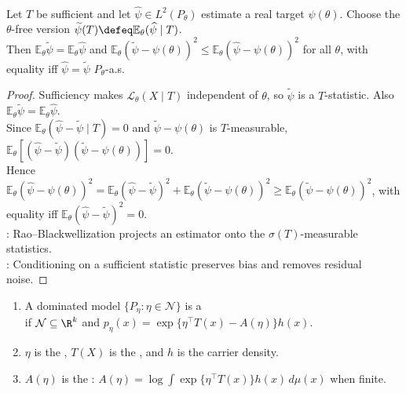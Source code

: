\begin{theorem} \label{thm:rao-blackwell-improvement} \\
Let $T$ be sufficient and let $\widehat{\psi}\in L^2(P_\theta)$ estimate a real target $\psi(\theta)$. Choose the $\theta$-free version $\widetilde{\psi}(T)\defeq\mathbb{E}_\theta(\widehat{\psi}\mid T)$.\\
Then $\mathbb{E}_\theta\widetilde{\psi}=\mathbb{E}_\theta\widehat{\psi}$ and $\mathbb{E}_\theta(\widetilde{\psi}-\psi(\theta))^2\leq\mathbb{E}_\theta(\widehat{\psi}-\psi(\theta))^2$ for all $\theta$, with equality iff $\widehat{\psi}=\widetilde{\psi}$ $P_\theta$-a.s.
\begin{proof}
Sufficiency makes $\mathcal{L}_\theta(X\mid T)$ independent of $\theta$, so $\widetilde{\psi}$ is a $T$-statistic. Also $\mathbb{E}_\theta\widetilde{\psi}=\mathbb{E}_\theta\widehat{\psi}$.\\
Since $\mathbb{E}_\theta(\widehat{\psi}-\widetilde{\psi}\mid T)=0$ and $\widetilde{\psi}-\psi(\theta)$ is $T$-measurable, $\mathbb{E}_\theta[(\widehat{\psi}-\widetilde{\psi})(\widetilde{\psi}-\psi(\theta))]=0$.\\
Hence $\mathbb{E}_\theta(\widehat{\psi}-\psi(\theta))^2=\mathbb{E}_\theta(\widehat{\psi}-\widetilde{\psi})^2+\mathbb{E}_\theta(\widetilde{\psi}-\psi(\theta))^2\geq\mathbb{E}_\theta(\widetilde{\psi}-\psi(\theta))^2$, with equality iff $\mathbb{E}_\theta(\widehat{\psi}-\widetilde{\psi})^2=0$.\\
: Rao--Blackwellization projects an estimator onto the $\sigma(T)$-measurable statistics.\\
: Conditioning on a sufficient statistic preserves bias and removes residual noise.
\end{proof}
\end{theorem}

\begin{definition} \label{def:exponential-family-natural-statistic} 
\begin{enumerate}[label=(\roman*)]
\setlength{\itemsep}{0pt}
\item A dominated model $\{P_\eta:\eta\in\mathcal{N}\}$ is a \\
if $\mathcal{N}\subseteq\R^k$ and $p_\eta(x)=\exp\{\eta^\top T(x)-A(\eta)\}h(x)$.
\item $\eta$ is the , $T(X)$ is the , and $h$ is the carrier density.
\item $A(\eta)$ is the : $A(\eta)=\log\int\exp\{\eta^\top T(x)\}h(x)\,d\mu(x)$ when finite.
\end{enumerate}
\end{definition}


